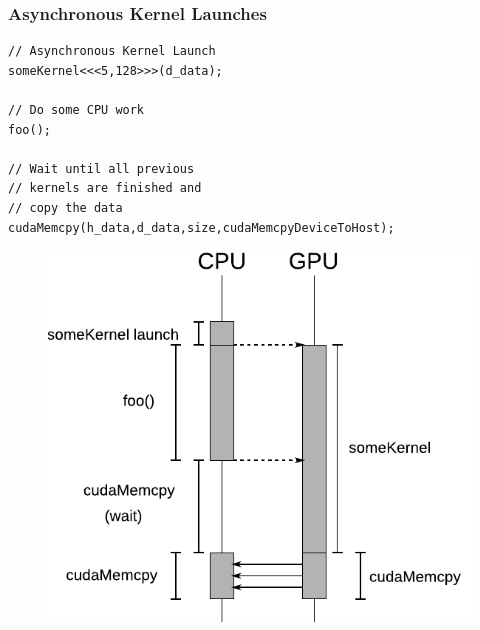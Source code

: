 \documentclass[aspectratio=169,handout]{beamer}
\begin{document}
\begin{frame}[fragile]
\frametitle{Asynchronous Kernel Launches}
\begin{minipage}{0.45\linewidth}
\begin{lstlisting}
// Asynchronous Kernel Launch
someKernel<<<5,128>>>(d_data);

// Do some CPU work
foo();

// Wait until all previous 
// kernels are finished and 
// copy the data
cudaMemcpy(h_data,d_data,size,cudaMemcpyDeviceToHost);
\end{lstlisting}
\end{minipage}
\begin{minipage}{0.5\linewidth}
	\vspace{0.3cm}
		\begin{figure}
	\includegraphics[height=0.9\textheight]{asynclaunch}
\end{figure}
\end{minipage}
\end{frame}
\end{document}

